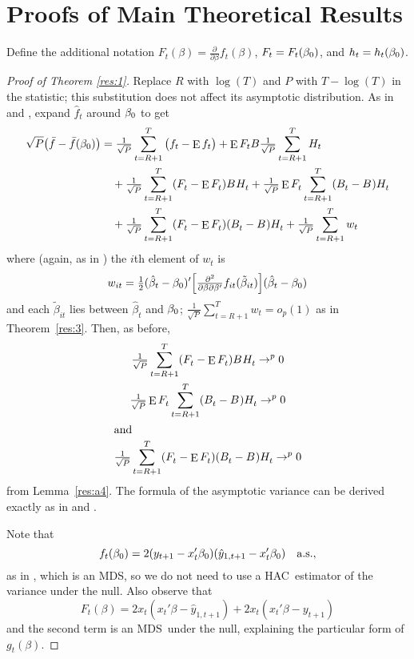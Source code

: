 \documentclass[12pt,fleqn]{article}
\theoremstyle{definition}
\DeclareMathOperator{\E}{E}
\newcommand{\btrue}[1][]{\if#1*\hat\beta_{T+1}\else\beta_0\fi}
\newcommand{\bh}{\hat{\beta}}
\newcommand{\bt}{\tilde{\beta}}
\newcommand{\fb}{\bar{f}}
\newcommand{\fh}{\hat{f}}
\newcommand{\yh}{\hat{y}}
\newcommand{\osum}[1]{\sum_{#1=R+1}^T}
\newcommand{\oclt}[1]{\tfrac{1}{\sqrt{P}} \osum{#1}}
\newcommand{\hac}{HAC}
\newcommand{\mds}{MDS}
\begin{document}
\appendix
\section{Proofs of Main Theoretical Results}
\label{sec:B}

\newcommand{\WesA}[1][]{\oclt{t}
  (F_t^{#1} - \E^{#1} F_t^{#1}) B^{#1} H_t^{#1}}
\newcommand{\WesB}[1][]{\tfrac{1}{\sqrt{P}} \E^{#1} F_t^{#1} \osum{t} (B_t^{#1} -
  B^{#1}) H_t^{#1}}
\newcommand{\WesC}[1][]{\oclt{t}
  (F_t^{#1} - \E^{#1} F_t^{#1}) (B_t^{#1} - B^{#1}) H_t^{#1}}

Define the additional notation 
$F_t(\beta) = \tfrac{\partial}{\partial \beta} f_t(\beta)$,
$F_t = F_t(\btrue)$,
and
$h_t = h_t(\btrue)$.
    
\begin{proof}[Proof of Theorem \ref{res:1}]
  Replace $R$ with $\log(T)$ and $P$ with $T - \log(T)$ in the
  statistic; this substitution does not affect its asymptotic
  distribution.
  As in \citet{Wes:96} and \citet{WeM:98}, expand $\fh_t$ around
  $\btrue$ to get
  \begin{align*}
    \sqrt{P} \big(\fb - \fb(\btrue)\big) &= \oclt{t}
    \big(f_t - \E f_t\big) +
    \E F_t B \oclt{t} H_t \\
    & \quad + \WesA + \WesB \\ & \quad + \WesC + \oclt{t} w_t
  \end{align*}
  where (again, as in \citealp{Wes:96}) the $i$th element of $w_t$ is
  \begin{equation*}
    w_{it} = \tfrac12 (\bh_t - \btrue)'
    \Big[\tfrac{\partial^2}{\partial \beta \partial\beta'}
    f_{it}(\bt_{it}) \Big]
    (\bh_t - \btrue)
  \end{equation*}
  and each $\bt_{it}$ lies between $\bh_t$ and
  $\btrue$; $\oclt{t} w_t = o_{p}(1)$ as in Theorem~\ref{res:3}.
  Then, as before,
  \begin{gather}
    \WesA \to^{p} 0 \label{eq:11} \\
    \WesB \to^{p} 0 \label{eq:12}\\
  \intertext{and}
    \WesC \to^{p} 0 \label{eq:13}
  \end{gather}
  from Lemma~\ref{res:a4}.  The formula of the asymptotic variance can
  be derived exactly as in \citet{Wes:96} and \citet{WeM:98}.

  Note that \[f_t(\btrue)= 2 (y_{t+1} -
  x_t'\btrue)(\yh_{1,t+1} - x_t'\btrue) \quad \text{a.s.},\] as
  in \citet{ClW:07}, which is an \mds, so we do not need to use a
  \hac\ estimator of the variance under the null.  Also observe that
  \[F_t(\beta) = 2 x_t(x_t'\beta - \yh_{1,t+1}) + 2 x_t(x_t'\beta -
  y_{t+1})\] and the second term is an \mds\ under the null,
  explaining the particular form of $g_t(\beta)$.
\end{proof}
\end{document}
